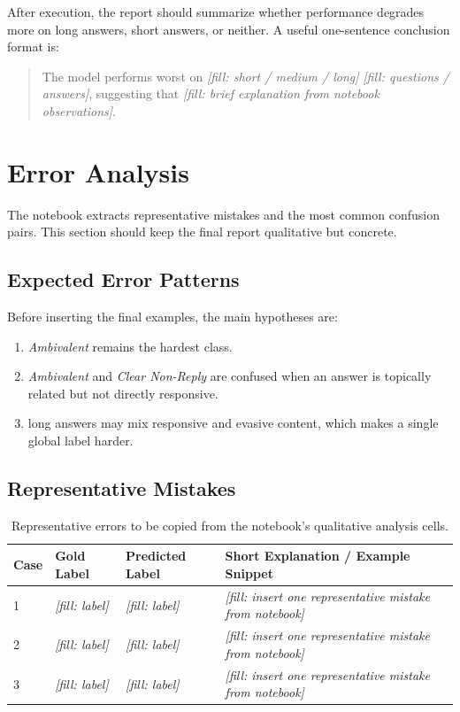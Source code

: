 \documentclass[12pt]{fphw}
\newcommand{\placeholder}[1]{\textit{[fill: #1]}}
\begin{document}
After execution, the report should summarize whether performance degrades more on long answers, short answers, or neither. A useful one-sentence conclusion format is:

\begin{quote}
The model performs worst on \placeholder{short / medium / long} \placeholder{questions / answers}, suggesting that \placeholder{brief explanation from notebook observations}.
\end{quote}

\section{Error Analysis}

The notebook extracts representative mistakes and the most common confusion pairs. This section should keep the final report qualitative but concrete.

\subsection{Expected Error Patterns}

Before inserting the final examples, the main hypotheses are:
\begin{enumerate}
	\item \emph{Ambivalent} remains the hardest class.
	\item \emph{Ambivalent} and \emph{Clear Non-Reply} are confused when an answer is topically related but not directly responsive.
	\item long answers may mix responsive and evasive content, which makes a single global label harder.
\end{enumerate}

\subsection{Representative Mistakes}

\begin{table}[h]
\centering
\small
\begin{tabularx}{\textwidth}{l l l X}
\toprule
Case & Gold Label & Predicted Label & Short Explanation / Example Snippet \\
\midrule
1 & \placeholder{label} & \placeholder{label} & \placeholder{insert one representative mistake from notebook} \\
2 & \placeholder{label} & \placeholder{label} & \placeholder{insert one representative mistake from notebook} \\
3 & \placeholder{label} & \placeholder{label} & \placeholder{insert one representative mistake from notebook} \\
\bottomrule
\end{tabularx}
\caption{Representative errors to be copied from the notebook's qualitative analysis cells.}
\label{tab:error-examples}
\end{table}
\end{document}
